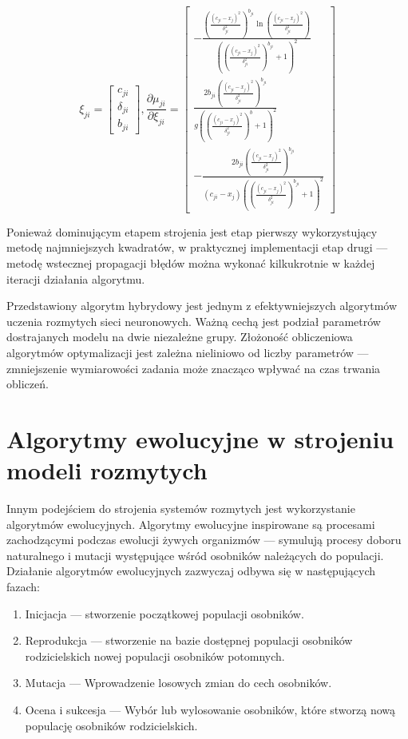 \documentclass[a4paper,12pt,titlepage]{article}
\begin{document}
\begin{equation}
\xi _{ji} = 
\left[ \begin{array}{c}
c_{ji} \\ \delta _{ji} \\ b_{ji}
\end{array} \right],
\frac{\partial \mu _{ji}}{\partial \xi _{ji}} = 
\left[ \begin{array}{c}
- \frac{\left(\frac{(c_{ji}-x_j)^2}{\delta _{ji}^2}\right)^{b_{ji}} \ln \left(\frac{(c_{ji}-x_j)^2}{\delta _{ji}^2}\right)}{\left(\left(\frac{(c_{ji}-x_j)^2}{\delta _{ji}^2}\right)^{b_{ji}} + 1\right)^2} \\

\frac{2b_{ji}\left(\frac{(c_{ji} - x_{j})^2}{\delta _{ji}^2}\right)^{b_{ji}}}{g\left(\left(\frac{(c_{ji}-x_{j})^2}{\delta _{ji}^2}\right)^b + 1\right)^2} \\

- \frac{2b_{ji}\left(\frac{(c_{ji} - x_j)^2}{\delta _{ji}^2}\right)^{b_{ji}}}{(c_{ji} - x_j)\left(\left(\frac{(c_{ji} - x_j)^2}{\delta _{ji}^2}\right)^{b_{ji}} + 1\right)^2}

\end{array} \right]
\end{equation}

Ponieważ dominującym etapem strojenia jest etap pierwszy wykorzystujący metodę najmniejszych kwadratów, w praktycznej implementacji etap drugi --- metodę wstecznej propagacji błędów można wykonać kilkukrotnie w każdej iteracji działania algorytmu.

Przedstawiony algorytm hybrydowy jest jednym z efektywniejszych algorytmów uczenia rozmytych sieci neuronowych. Ważną cechą jest podział parametrów dostrajanych modelu na dwie niezależne grupy. Złożoność obliczeniowa algorytmów optymalizacji jest zależna nieliniowo od liczby parametrów --- zmniejszenie wymiarowości zadania może znacząco wpływać na czas trwania obliczeń.

\section{Algorytmy ewolucyjne w strojeniu modeli rozmytych}

Innym podejściem do strojenia systemów rozmytych jest wykorzystanie algorytmów ewolucyjnych. Algorytmy ewolucyjne inspirowane są procesami zachodzącymi podczas ewolucji żywych organizmów --- symulują procesy doboru naturalnego i mutacji występujące wśród osobników należących do populacji. Działanie algorytmów ewolucyjnych zazwyczaj odbywa się w następujących fazach:
\begin{enumerate}
\item Inicjacja --- stworzenie początkowej populacji osobników.
\item Reprodukcja --- stworzenie na bazie dostępnej populacji osobników rodzicielskich nowej populacji osobników potomnych.
\item Mutacja --- Wprowadzenie losowych zmian do cech osobników.
\item Ocena i sukcesja --- Wybór lub wylosowanie osobników, które stworzą nową populację osobników rodzicielskich.
\end{enumerate}
\end{document}
